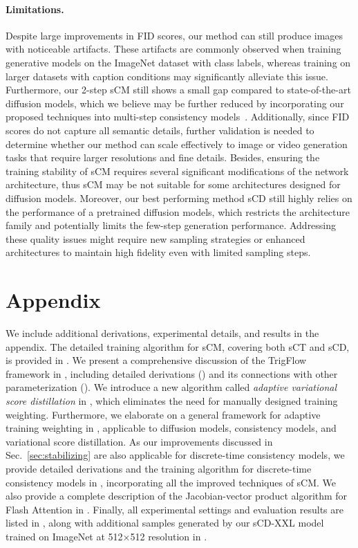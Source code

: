 \paragraph{Limitations.}
Despite large improvements in FID scores, our method can still produce images with noticeable artifacts. These artifacts are commonly observed when training generative models on the ImageNet dataset with class labels, whereas training on larger datasets with caption conditions may significantly alleviate this issue. Furthermore, our 
2-step sCM still shows a small gap compared to state-of-the-art diffusion models, which we believe may be further reduced by incorporating our proposed techniques into multi-step consistency models~\citep{heek2024multistepcm}. Additionally, since FID scores do not capture all semantic details, further validation is needed to determine whether our method can scale effectively to image or video generation tasks that require larger resolutions and fine details. Besides, ensuring the training stability of sCM requires several significant modifications of the network architecture, thus sCM may be not suitable for some architectures designed for diffusion models. Moreover, our best performing method sCD still highly relies on the performance of a pretrained diffusion models, which restricts the architecture family and potentially limits the few-step generation performance. Addressing these quality issues might require new sampling strategies or enhanced architectures to maintain high fidelity even with limited sampling steps.




\section*{Appendix}
We include additional derivations, experimental details, and results in the appendix. The detailed training algorithm for sCM, covering both sCT and sCD, is provided in . We present a comprehensive discussion of the TrigFlow framework in , including detailed derivations () and its connections with other parameterization (). We introduce a new algorithm called \textit{adaptive variational score distillation} in , which eliminates the need for manually designed training weighting. Furthermore, we elaborate on a general framework for adaptive training weighting in , applicable to diffusion models, consistency models, and variational score distillation. As our improvements discussed in Sec.~\ref{sec:stabilizing} are also applicable for discrete-time consistency models, we provide detailed derivations and the training algorithm for discrete-time consistency models in , incorporating all the improved techniques of sCM. We also provide a complete description of the Jacobian-vector product algorithm for Flash Attention in . Finally, all experimental settings and evaluation results are listed in , along with additional samples generated by our sCD-XXL model trained on ImageNet at 512×512 resolution in .

